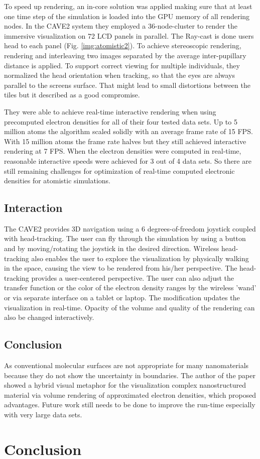\documentclass[10pt,twocolumn,letterpaper]{article}
\begin{document}
\setlength{\parindent}{1pc}To speed up rendering, an in-core solution was applied making sure that at least one time step of the simulation is loaded into the GPU memory of all rendering nodes. In the CAVE2 \cite{febretti2013cave2} system they employed a 36-node-cluster to render the immersive visualization on 72 LCD panels in parallel. The Ray-cast is done users head to each panel (Fig. \ref{img:atomistic2}). To achieve stereoscopic rendering, rendering and interleaving two images separated by the average inter-pupillary distance is applied. To support correct viewing for multiple individuals, they normalized the head orientation when tracking, so that the eyes are always parallel to the screens surface. That might lead to small distortions between the tiles but it described as a good compromise. 

\setlength{\parindent}{1pc}They were able to achieve real-time interactive rendering when using precomputed electron densities for all of their four tested data sets. Up to 5 million atoms the algorithm scaled solidly with an average frame rate of 15 FPS. With 15 million atoms the frame rate halves but they still achieved interactive rendering at 7 FPS. When the electron densities were computed in real-time, reasonable interactive speeds were achieved for 3 out of 4 data sets. So there are still remaining challenges for optimization of real-time computed electronic densities for atomistic simulations.

\subsection{Interaction}
The CAVE2 \cite{febretti2013cave2} provides 3D navigation using a 6 degrees-of-freedom joystick coupled with head-tracking. The user can fly through the simulation by using a button and by moving/rotating the joystick in the desired direction. Wireless head-tracking also enables the user to explore the visualization by physically walking in the space, causing the view to be rendered from his/her perspective. The head-tracking provides a user-centered perspective. The user can also adjust the transfer function or the color of the electron density ranges by the wireless 'wand' or via separate interface on a tablet or laptop. The modification updates the visualization in real-time. Opacity of the volume and quality of the rendering can also be changed interactively.

\subsection{Conclusion}
As conventional molecular surfaces are not appropriate for many nanomaterials because they do not show the uncertainty in boundaries. The author of the paper showed a hybrid visual metaphor for the visualization complex nanostructured material via volume rendering of approximated electron densities, which proposed advantages. Future work still needs to be done to improve the run-time especially with very large data sets.

\section{Conclusion}

{\small


}
\end{document}
